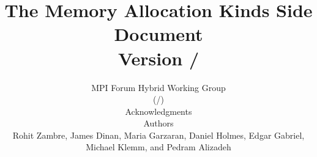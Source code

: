 \documentclass[twoside,11pt,fleqn]{book}
\def\disclaim{{%
  }}
\begin{document}

\title{The Memory Allocation Kinds Side Document \\
{\Large Version \MEMALLOCVERSION/}\\
}

\author{
}

\date{
MPI Forum Hybrid Working Group\\
(\MEMALLOCDATE/)\\[2ex]
Acknowledgments\\[1.5ex]
Authors\\
Rohit Zambre, James Dinan,
Maria Garzaran, Daniel Holmes,
Edgar Gabriel, Michael Klemm, and Pedram Alizadeh%
\vspace{0.2in}
}

\frontmatter
\maketitle

\pagestyle{plain} 
\setcounter{page}{2} 
\hfuzz=5pt
 
\newpage
\pagestyle{empty}
\contentstrue
\pagestyle{plain}
\tableofcontents
\contentsfalse

\ifodd\value{page}\else\hbox{}\thispagestyle{empty}\newpage\fi

\mainmatter  %
\withlinenumbers
\setpagewiselinenumbers
\linenumbers

\pagestyle{fancy}  
\fancyhf{}
\fancyfoot[C]{\thepage\\
\disclaim}

%

\startchap


\newpage 
\appendix

{}


\end{document}
